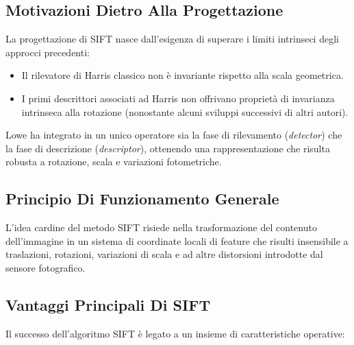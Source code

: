 ﻿\documentclass[11pt, a4paper]{article}
\begin{document}
\subsection{Motivazioni Dietro Alla Progettazione}


La progettazione di SIFT nasce dall'esigenza di superare i limiti intrinseci degli approcci precedenti:
\begin{itemize}
    \item Il rilevatore di Harris classico non è invariante rispetto alla scala geometrica.
    \item I primi descrittori associati ad Harris non offrivano proprietà di invarianza intrinseca alla rotazione (nonostante alcuni sviluppi successivi di altri autori).
\end{itemize}
Lowe ha integrato in un unico operatore sia la fase di rilevamento (\emph{detector}) che la fase di descrizione (\emph{descriptor}), ottenendo una rappresentazione che risulta robusta a rotazione, scala e variazioni fotometriche.

\subsection{Principio Di Funzionamento Generale}

L'idea cardine del metodo SIFT risiede nella trasformazione del contenuto dell'immagine in un sistema di coordinate locali di feature che risulti insensibile a traslazioni, rotazioni, variazioni di scala e ad altre distorsioni introdotte dal sensore fotografico.


\subsection{Vantaggi Principali Di SIFT}

Il successo dell'algoritmo SIFT è legato a un insieme di caratteristiche operative:

\end{document}
